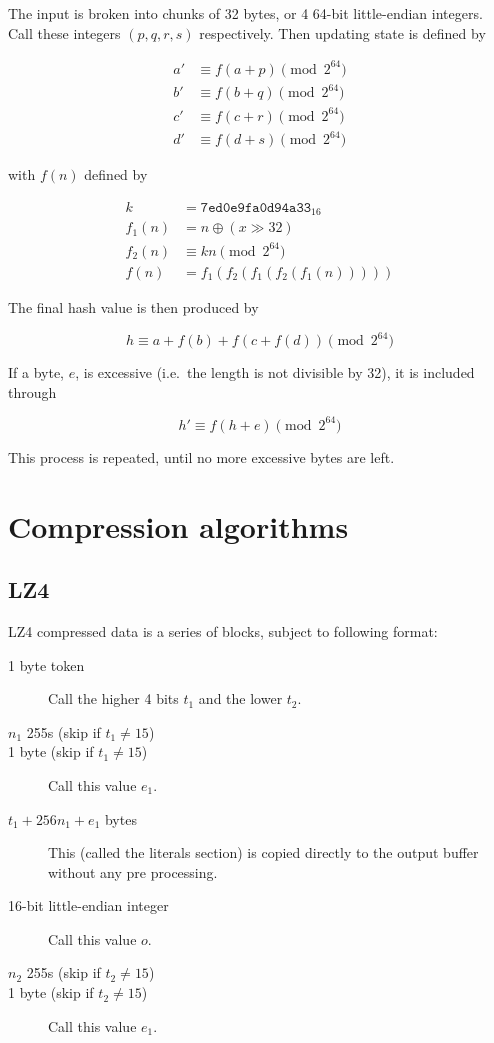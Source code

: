 \documentclass[11pt,a4paper]{report}
\begin{document}
        The input is broken into chunks of 32 bytes, or 4 64-bit little-endian
        integers. Call these integers $(p, q, r, s)$ respectively. Then
        updating state is defined by

        \begin{align*}
            a' &\equiv f(a + p) \pmod{2^{64}} \\
            b' &\equiv f(b + q) \pmod{2^{64}} \\
            c' &\equiv f(c + r) \pmod{2^{64}} \\
            d' &\equiv f(d + s) \pmod{2^{64}}
        \end{align*}

        with $f(n)$ defined by

        \begin{align*}
            k      &=      \texttt{7ed0e9fa0d94a33}_{16} \\
            f_1(n) &=      n \oplus (x \gg 32) \\
            f_2(n) &\equiv kn \pmod{2^{64}} \\
            f(n)   &=      f_1(f_2(f_1(f_2(f_1(n)))))
        \end{align*}

        The final hash value is then produced by

        $$h \equiv a + f(b) + f(c + f(d)) \pmod{2^{64}}$$

        If a byte, $e$, is excessive (i.e.\ the length is not divisible by 32),
        it is included through

        $$h' \equiv f(h + e) \pmod{2^{64}}$$

        This process is repeated, until no more excessive bytes are left.

    \section{Compression algorithms}
        \subsection{LZ4}
        \label{compression:lz4}
        LZ4 compressed data is a series of blocks, subject to following format:

        \begin{description}
            \item [1 byte token] Call the higher 4 bits $t_1$ and the lower $t_2$.
            \item [$n_1$ 255s (skip if $t_1 \neq 15$)]
            \item [1 byte (skip if $t_1 \neq 15$)] Call this value $e_1$.
            \item [$t_1 + 256n_1 + e_1$ bytes] This (called the literals
                section) is copied directly to the output buffer without any
                pre processing.
            \item [16-bit little-endian integer] Call this value $o$.
            \item [$n_2$ 255s (skip if $t_2 \neq 15$)]
            \item [1 byte (skip if $t_2 \neq 15$)] Call this value $e_1$.
        \end{description}
\end{document}

